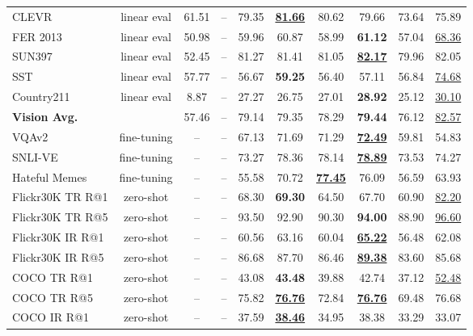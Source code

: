 \documentclass[10pt,twocolumn,letterpaper]{article}
\begin{document}
\begin{table*}[t]
\begin{tabular}{l@{\ }c|ccccccc|c}
CLEVR \cite{johnson2017clevr} & linear eval & 61.51 & -- & 79.35 & \underline{\textbf{81.66}} & 80.62 & 79.66 & 73.64 & 75.89 \\
FER 2013 \cite{goodfellow2014explaining} & linear eval & 50.98 & -- & 59.96 & 60.87 & 58.99 & \textbf{61.12} & 57.04 & \underline{68.36} \\
SUN397 \cite{xiao2016sun} & linear eval & 52.45 & -- & 81.27 & 81.41 & 81.05 & \underline{\textbf{82.17}} & 79.96 & 82.05 \\
SST \cite{radford2021learning} & linear eval & 57.77 & -- & 56.67 & \textbf{59.25} & 56.40 & 57.11 & 56.84 & \underline{74.68} \\
Country211 \cite{radford2021learning} & linear eval & 8.87 & -- & 27.27 & 26.75 & 27.01 & \textbf{28.92} & 25.12 & \underline{30.10} \\
\midrule 
\textbf{Vision Avg.} &  & 57.46 & -- & 79.14 & 79.35 & 78.29 & \textbf{79.44} & 76.12 & \underline{82.57} \\
\midrule
VQAv2 \cite{goyal2017making} & fine-tuning & -- & -- & 67.13 & 71.69 & 71.29 & \underline{\textbf{72.49}} & 59.81 & 54.83 \\
SNLI-VE \cite{xie2019visual} & fine-tuning & -- & -- & 73.27 & 78.36 & 78.14 & \underline{\textbf{78.89}} & 73.53 & 74.27 \\
Hateful Memes \cite{kiela2020hateful} & fine-tuning & -- & -- & 55.58 & 70.72 & \underline{\textbf{77.45}} & 76.09 & 56.59 & 63.93 \\
Flickr30K \cite{flickr30k} TR R@1 & zero-shot & -- & -- & 68.30 & \textbf{69.30} & 64.50 & 67.70 & 60.90 & \underline{82.20} \\
Flickr30K \cite{flickr30k} TR R@5 & zero-shot & -- & -- & 93.50 & 92.90 & 90.30 & \textbf{94.00} & 88.90 & \underline{96.60} \\
Flickr30K \cite{flickr30k} IR R@1 & zero-shot & -- & -- & 60.56 & 63.16 & 60.04 & \underline{\textbf{65.22}} & 56.48 & 62.08 \\
Flickr30K \cite{flickr30k} IR R@5 & zero-shot & -- & -- & 86.68 & 87.70 & 86.46 & \underline{\textbf{89.38}} & 83.60 & 85.68 \\
COCO \cite{coco} TR R@1 & zero-shot & -- & -- & 43.08 & \textbf{43.48} & 39.88 & 42.74 & 37.12 & \underline{52.48} \\
COCO \cite{coco} TR R@5 & zero-shot & -- & -- & 75.82 & \underline{\textbf{76.76}} & 72.84 & \underline{\textbf{76.76}} & 69.48 & 76.68 \\
COCO \cite{coco} IR R@1 & zero-shot & -- & -- & 37.59 & \underline{\textbf{38.46}} & 34.95 & 38.38 & 33.29 & 33.07 \\

\end{tabular}
\end{table*}
\end{document}
